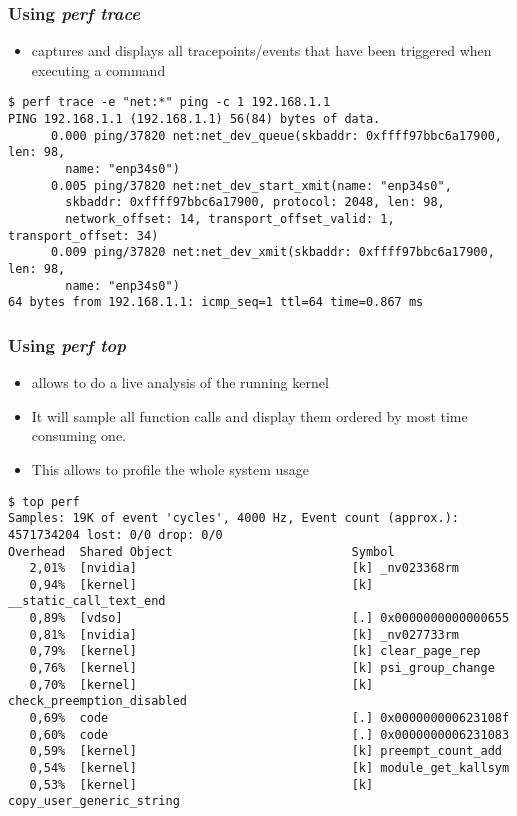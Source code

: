 \begin{frame}[fragile]
  \frametitle{Using {\em perf trace} }
  \begin{itemize}
    \item {} captures and displays all tracepoints/events that
          have been triggered when executing a command
  \end{itemize}

  \begin{block}{}
    \begin{verbatim}
$ perf trace -e "net:*" ping -c 1 192.168.1.1
PING 192.168.1.1 (192.168.1.1) 56(84) bytes of data.
      0.000 ping/37820 net:net_dev_queue(skbaddr: 0xffff97bbc6a17900, len: 98,
        name: "enp34s0")
      0.005 ping/37820 net:net_dev_start_xmit(name: "enp34s0",
        skbaddr: 0xffff97bbc6a17900, protocol: 2048, len: 98,
        network_offset: 14, transport_offset_valid: 1, transport_offset: 34)
      0.009 ping/37820 net:net_dev_xmit(skbaddr: 0xffff97bbc6a17900, len: 98,
        name: "enp34s0")
64 bytes from 192.168.1.1: icmp_seq=1 ttl=64 time=0.867 ms
    \end{verbatim}
  \end{block}
\end{frame}

\begin{frame}[fragile]
  \frametitle{Using {\em perf top} }
  \begin{itemize}
    \item {} allows to do a live analysis of the running kernel
    \item It will sample all function calls and display them ordered by most
          time consuming one.
    \item This allows to profile the whole system usage
  \end{itemize}

  \begin{block}{}
    \begin{verbatim}
$ top perf
Samples: 19K of event 'cycles', 4000 Hz, Event count (approx.): 4571734204 lost: 0/0 drop: 0/0
Overhead  Shared Object                         Symbol
   2,01%  [nvidia]                              [k] _nv023368rm
   0,94%  [kernel]                              [k] __static_call_text_end
   0,89%  [vdso]                                [.] 0x0000000000000655
   0,81%  [nvidia]                              [k] _nv027733rm
   0,79%  [kernel]                              [k] clear_page_rep
   0,76%  [kernel]                              [k] psi_group_change
   0,70%  [kernel]                              [k] check_preemption_disabled
   0,69%  code                                  [.] 0x000000000623108f
   0,60%  code                                  [.] 0x0000000006231083
   0,59%  [kernel]                              [k] preempt_count_add
   0,54%  [kernel]                              [k] module_get_kallsym
   0,53%  [kernel]                              [k] copy_user_generic_string
    \end{verbatim}
  \end{block}
\end{frame}

